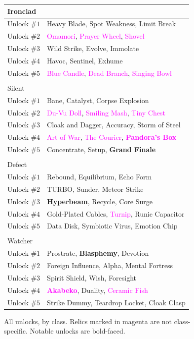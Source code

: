 \documentclass[12pt]{amsart}
\newcommand{\magenta}[1]{\textcolor{magenta}{#1}}
\begin{document}
\begin{figure}[h]
\begin{tabular}{l|l}
Ironclad     &                                             \\ \hline
Unlock \#$1$ & Heavy Blade, Spot Weakness, Limit Break     \\
Unlock \#$2$ & \magenta{Omamori}, \magenta{Prayer Wheel}, \magenta{Shovel}               \\
Unlock \#$3$ & Wild Strike, Evolve, Immolate               \\
Unlock \#$4$ & Havoc, Sentinel, Exhume                     \\
Unlock \#$5$ & \magenta{Blue Candle}, \magenta{Dead Branch}, \magenta{Singing Bowl}      \\ \\
Silent       &                                             \\ \hline
Unlock \#$1$ & Bane, Catalyst, Corpse Explosion            \\
Unlock \#$2$ & \magenta{Du-Vu Doll}, \magenta{Smiling Mash}, \magenta{Tiny Chest}        \\
Unlock \#$3$ & Cloak and Dagger, Accuracy, Storm of Steel  \\
Unlock \#$4$ & \magenta{Art of War}, \magenta{The Courier}, \textbf{\magenta{Pandora's Box}}      \\
Unlock \#$5$ & Concentrate, Setup, \textbf{Grand Finale}            \\ \\
Defect       &                                             \\ \hline
Unlock \#$1$ & Rebound, Equilibrium, Echo Form             \\
Unlock \#$2$ & TURBO, Sunder, Meteor Strike                \\
Unlock \#$3$ & \textbf{Hyperbeam}, Recycle, Core Surge              \\
Unlock \#$4$ & Gold-Plated Cables, \magenta{Turnip}, Runic Capacitor \\
Unlock \#$5$ & Data Disk, Symbiotic Virus, Emotion Chip    \\ \\
Watcher      &                                             \\ \hline
Unlock \#$1$ & Prostrate, \textbf{Blasphemy}, Devotion              \\
Unlock \#$2$ & Foreign Influence, Alpha, Mental Fortress   \\
Unlock \#$3$ & Spirit Shield, Wish, Foresight              \\
Unlock \#$4$ & \textbf{\magenta{Akabeko}}, Duality, \magenta{Ceramic Fish}              \\
Unlock \#$5$ & Strike Dummy, Teardrop Locket, Cloak Clasp 
\end{tabular}
    \caption{
        All unlocks, by class.  
        Relics marked in magenta are not class-specific.  
        Notable unlocks are bold-faced.  
    }
    \label{fig: class unlocks}
\end{figure}
\end{document}
